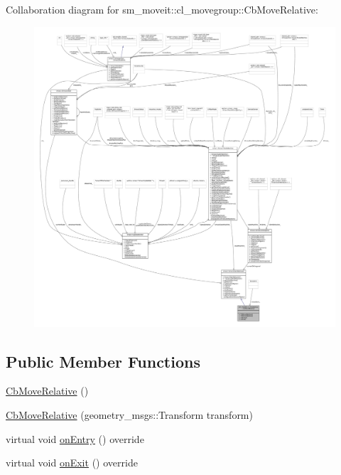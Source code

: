 Collaboration diagram for sm\+\_\+moveit\+:\+:cl\+\_\+movegroup\+:\+:Cb\+Move\+Relative\+:
\nopagebreak
\begin{figure}[H]
\begin{center}
\leavevmode
\includegraphics[width=350pt]{classsm__moveit_1_1cl__movegroup_1_1CbMoveRelative__coll__graph}
\end{center}
\end{figure}
\subsection*{Public Member Functions}
\begin{DoxyCompactItemize}
\item 
\hyperlink{classsm__moveit_1_1cl__movegroup_1_1CbMoveRelative_a224327b6bf03425fc574c15d1ce50591}{Cb\+Move\+Relative} ()
\item 
\hyperlink{classsm__moveit_1_1cl__movegroup_1_1CbMoveRelative_ae1b020e695d2e12d80ebaed2d0b5fa24}{Cb\+Move\+Relative} (geometry\+\_\+msgs\+::\+Transform transform)
\item 
virtual void \hyperlink{classsm__moveit_1_1cl__movegroup_1_1CbMoveRelative_a8b65be000f0cb31a5670a249c95fa9c2}{on\+Entry} () override
\item 
virtual void \hyperlink{classsm__moveit_1_1cl__movegroup_1_1CbMoveRelative_ac4967666966ca32eb8d77d2f70155926}{on\+Exit} () override
\end{DoxyCompactItemize}
